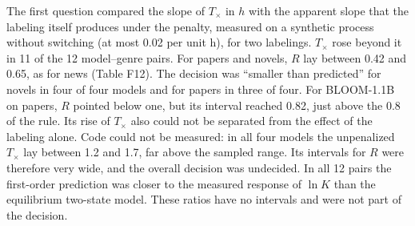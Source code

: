 \documentclass[aps,prx,onecolumn,superscriptaddress,longbibliography]{revtex4-2}
\begin{document}
The first question compared the slope of \(T_{\times}\) in \(h\) with the apparent slope that the labeling itself produces under the penalty, measured on a synthetic process without switching (at most 0.02 per unit h), for two labelings. \(T_{\times}\) rose beyond it in 11 of the 12 model--genre pairs. For papers and novels, \(R\) lay between 0.42 and 0.65, as for news (Table F12). The decision was ``smaller than predicted'' for novels in four of four models and for papers in three of four. For BLOOM-1.1B on papers, \(R\) pointed below one, but its interval reached 0.82, just above the 0.8 of the rule. Its rise of \(T_{\times}\) also could not be separated from the effect of the labeling alone. Code could not be measured: in all four models the unpenalized \(T_{\times}\) lay between 1.2 and 1.7, far above the sampled range. Its intervals for \(R\) were therefore very wide, and the overall decision was undecided. In all 12 pairs the first-order prediction was closer to the measured response of \(\ln K\) than the equilibrium two-state model. These ratios have no intervals and were not part of the decision.
\end{document}
